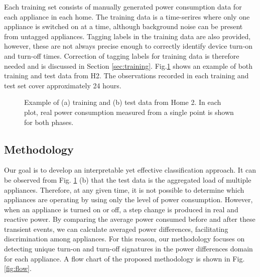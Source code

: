 \documentclass[conference]{IEEEtran}
\begin{document}
Each training set consists of manually generated power consumption data for each appliance in each home.  The training data is a time-serires where only one appliance is switched on at a time, although background noise can be present from untagged appliances. Tagging labels in the training data are also provided, however, these are not always precise enough to correctly identify device turn-on and turn-off times. Correction of tagging labels for training data is therefore needed and is discussed in Section \ref{sec:training}.  Fig.\ref{fig:traintest} shows an example of both training and test data from H2.  The observations recorded in each training and test set cover approximately 24 hours.  

\begin{figure}[!h]	
	\centering
		\hfil
	\caption{Example of (a) training and (b) test data from Home 2.  In each plot, real power consumption measured from a single point is shown for both phases. } 
	\label{fig:traintest}
\end{figure}


\subsection{Methodology}
Our goal is to develop an interpretable yet effective classification approach.  It can be observed from Fig. \ref{fig:traintest} (b) that the test data is the aggregated load of multiple appliances.  Therefore, at any given time, it is not possible to determine which appliances are operating by using only the level of power consumption.  However, when an appliance is turned on or off, a step change is produced in real and reactive power.  By comparing the average power consumed before and after these transient events, we can calculate averaged power differences, facilitating discrimination among appliances.  For this reason, our methodology focuses on detecting unique turn-on and turn-off signatures in the power differences domain for each appliance.  A flow chart of the proposed methodology is shown in Fig. \ref{fig:flow}.
\end{document}

